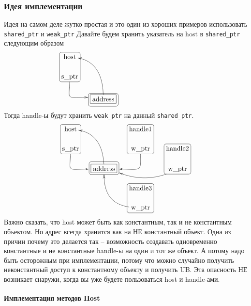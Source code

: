 \subsubsection{Идея имплементации}

Идея на самом деле жутко простая и это один из хороших примеров использовать \verb"shared_ptr" и \verb"weak_ptr"
Давайте будем хранить указатель на host в \verb"shared_ptr" следующим образом
\[
\xymatrix@R=15pt@C=15pt{
  {\text{host}}
  	{
	\save
   [].[d]*[F-:<3pt>]\frm{}
   \restore
	}
  &{}&{\phantom{handle1}}
  &{}
  \\ 
  {\text{s\_ptr}}\ar@(d,l)[dr]+(-8,0)&{}&{\phantom{s\_ptr}}&{\phantom{handle2}}
  \\
  {}&{\txt{address}}\ar@(u,r)[uul]
      	{
	\save
   [].[]*[F-]\frm{}
   \restore
	}
    	{
	\save
   [].[]*+[F-:<3pt>]\frm{}
   \restore
	}
  &{}&{\phantom{s\_ptr}}\\
}
\]
Тогда handle-ы будут хранить \verb"weak_ptr" на данный \verb"shared_ptr".
\[
\xymatrix@R=15pt@C=15pt{
  {\text{host}}
  	{
	\save
   [].[d]*[F-:<3pt>]\frm{}
   \restore
	}
  &{}&{\text{handle1}}
    	{
	\save
   [].[d]*[F-:<3pt>]\frm{}
   \restore
	}&{}
  \\ 
  {\text{s\_ptr}}\ar@(d,l)[dr]+(-8,0)&{}&{\text{w\_ptr}}\ar@(d,r)[dl]+(8,0)&{\text{handle2}}
   	{
	\save
   [].[d]*[F-:<3pt>]\frm{}
   \restore
	}
  \\
  {}&{\text{address}}\ar@(u,r)[uul]
      	{
	\save
   [].[]*[F-]\frm{}
   \restore
	}
    	{
	\save
   [].[]*+[F-:<3pt>]\frm{}
   \restore
	}
  &{}&{\text{w\_ptr}}\ar@/^10pt/[ll]+(8,-2)\\
  {}&{}&{\text{handle3}}
   	{
	\save
   [].[d]*[F-:<3pt>]\frm{}
   \restore
	}
  &{}\\
  {}&{}&{\text{w\_ptr}}\ar@(l,d)[luu]+(0,-3)&{}\\
}
\]
Важно сказать, что host может быть как константным, так и не константным объектом.
Но адрес всегда хранится как на НЕ константный объект.
Одна из причин почему это делается так -- возможность создавать одновременно константные и не константные handle-ы на один и тот же объект.
А потому надо быть осторожным при имплементации, потому что можно случайно получить неконстантный доступ к константному объекту и получить UB.
Эта опасность НЕ возникает снаружи, когда вы уже будете пользоваться host и handle-ами.

\paragraph{Имплементация методов Host}

